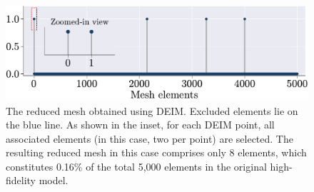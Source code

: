 \documentclass[11pt]{article}
\begin{document}
\begin{figure}[t]
    \centering
    \includegraphics[width=0.8\linewidth]{reduced_mesh_DEIM_new.pdf}
    \caption{The reduced mesh obtained using DEIM. Excluded  elements lie on the blue line. As shown in the inset, for each DEIM point, all associated elements (in this case, two per point) are selected. The resulting reduced mesh in this case comprises only 8 elements, which constitutes 0.16\% of the total 5,000 elements in the original high-fidelity model.}
    \label{fig:reduced_mesh_deim}
\end{figure}
\end{document}
